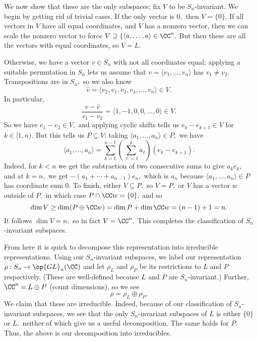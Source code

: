 We now show that these are the only subspaces; fix $V$ to be $S_n$-invariant. We begin by getting rid of trivial cases. If the only vector is $0,$ then $V=\{0\}.$ If all vectors in $V$ have all equal coordinates, and $V$ has a nonzero vector, then we can scale the nonzero vector to force $V\supseteq\{\langle a,\ldots,a\rangle\in\CC^n.$ But then these are all the vectors with equal coordinates, so $V=L.$

Otherwise, we have a vector $v\in S_n$ with not all coordinates equal; applying a suitable permutation in $S_n$ lets us assume that $v=\langle v_1,\ldots,v_n\rangle$ has $v_1\ne v_2.$ Transpositions are in $S_n,$ so we also know
\[\hat v=\langle v_2,v_1,v_3,v_4,\ldots,v_n\rangle\in V.\]
In particular,
\[\frac{v-\hat v}{v_1-v_2}=\langle1,-1,0,0,\ldots,0\rangle\in V.\]
So we have $e_1-e_2\in V,$ and applying cyclic shifts tells us $e_k-e_{k+1}\in V$ for $k\in[1,n).$ But this tells us $P\subseteq V$: taking $\langle a_1,\ldots,a_n\rangle\in P,$ we have
\[\langle a_1,\ldots,a_n\rangle=\sum_{k=1}^{n-1}\left(\sum_{\ell=1}^ka_\ell\right)(e_k-e_{k+1}).\]
Indeed, for $k<n$ we get the subtraction of two consecutive sums to give $a_ke_k,$ and at $k=n,$ we get $-(a_1+\cdots+a_{n-1})e_n,$ which is $a_n$ because $\langle a_1,\ldots,a_n\rangle\in P$ has coordinate sum $0.$ To finish, either $V\subseteq P,$ so $V=P,$ or $V$ has a vector $w$ outside of $P,$ in which case $P\cap\CC w=\{0\},$ and so
\[\dim V\ge\dim(P\oplus\CC w)=\dim P+\dim\CC w=(n-1)+1=n.\]
It follows $\dim V=n,$ so in fact $V=\CC^n.$ This completes the classification of $S_n$-invariant subspaces.

From here it is quick to decompose this representation into irreducible representations. Using our $S_n$-invariant subspaces, we label our representation $\rho:S_n\to\op{GL}_n(\CC)$ and let $\rho_L$ and $\rho_P$ be its restrictions to $L$ and $P$ respectively. (These are well-defined because $L$ and $P$ are $S_n$-invariant.) Further, $\CC^n=L\oplus P$ (count dimensions), so we see
\[\rho=\rho_L\oplus\rho_P.\]
We claim that these are irreducible. Indeed, because of our classification of $S_n$-invariant subspaces, we see that the only $S_n$-invariant subspaces of $L$ is either $\{0\}$ or $L,$ neither of which give us a useful decomposition. The same holds for $P.$ Thus, the above is our decomposition into irreducibles.

